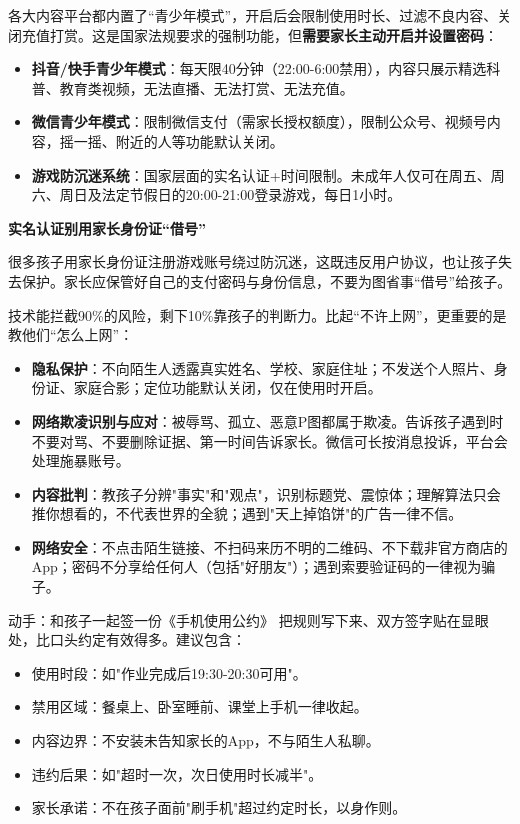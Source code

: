 
各大内容平台都内置了“青少年模式”，开启后会限制使用时长、过滤不良内容、关闭充值打赏。这是国家法规要求的强制功能，但\textbf{需要家长主动开启并设置密码}：

\begin{itemize}
  \item \textbf{抖音/快手青少年模式}：每天限40分钟（22:00-6:00禁用），内容只展示精选科普、教育类视频，无法直播、无法打赏、无法充值。
  \item \textbf{微信青少年模式}：限制微信支付（需家长授权额度），限制公众号、视频号内容，摇一摇、附近的人等功能默认关闭。
  \item \textbf{游戏防沉迷系统}：国家层面的实名认证+时间限制。未成年人仅可在周五、周六、周日及法定节假日的20:00-21:00登录游戏，每日1小时。
\end{itemize}

\textbf{实名认证别用家长身份证“借号”}\par

很多孩子用家长身份证注册游戏账号绕过防沉迷，这既违反用户协议，也让孩子失去保护。家长应保管好自己的支付密码与身份信息，不要为图省事“借号”给孩子。


技术能拦截90\%的风险，剩下10\%靠孩子的判断力。比起“不许上网”，更重要的是教他们“怎么上网”：

\begin{itemize}
  \item \textbf{隐私保护}：不向陌生人透露真实姓名、学校、家庭住址；不发送个人照片、身份证、家庭合影；定位功能默认关闭，仅在使用时开启。
  \item \textbf{网络欺凌识别与应对}：被辱骂、孤立、恶意P图都属于欺凌。告诉孩子遇到时不要对骂、不要删除证据、第一时间告诉家长。微信可长按消息投诉，平台会处理施暴账号。
  \item \textbf{内容批判}：教孩子分辨"事实"和"观点"，识别标题党、震惊体；理解算法只会推你想看的，不代表世界的全貌；遇到"天上掉馅饼"的广告一律不信。
  \item \textbf{网络安全}：不点击陌生链接、不扫码来历不明的二维码、不下载非官方商店的App；密码不分享给任何人（包括"好朋友"）；遇到索要验证码的一律视为骗子。
\end{itemize}

\begin{tcbpractice}{动手：和孩子一起签一份《手机使用公约》}
把规则写下来、双方签字贴在显眼处，比口头约定有效得多。建议包含：

\begin{itemize}
  \item 使用时段：如"作业完成后19:30-20:30可用"。
  \item 禁用区域：餐桌上、卧室睡前、课堂上手机一律收起。
  \item 内容边界：不安装未告知家长的App，不与陌生人私聊。
  \item 违约后果：如"超时一次，次日使用时长减半"。
  \item 家长承诺：不在孩子面前"刷手机"超过约定时长，以身作则。
\end{itemize}

\end{tcbpractice}

